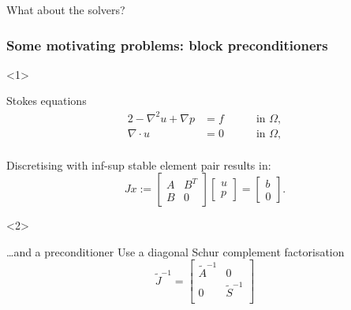 \documentclass[presentation,aspectratio=43, 10pt]{beamer}
\begin{document}
\begin{frame}[standout]
  What about the solvers?
\end{frame}

\begin{frame}[t]
  \frametitle{Some motivating problems: block preconditioners}

  \begin{onlyenv}<1>
    \begin{block}{Stokes equations}
      \begin{alignat*}{2}
        -\nabla^2 u + \nabla p &= f \quad && \text{ in } \Omega, \\
        \nabla \cdot u &= 0 \quad && \text{ in } \Omega, \\
      \end{alignat*}

      Discretising with inf-sup stable element pair results in:
      \begin{equation*}
        Jx := \begin{bmatrix}
          A & B^T \\
          B & 0
        \end{bmatrix}
        \begin{bmatrix}
          u \\ p
        \end{bmatrix}
        =
        \begin{bmatrix}
          b \\ 0
        \end{bmatrix}.
      \end{equation*}
    \end{block}
  \end{onlyenv}
  \begin{onlyenv}<2>
    \begin{block}{\dots and a preconditioner}
      Use a diagonal Schur complement factorisation
      \parencite{Silvester:1994}
      \begin{equation*}
        \tilde{J}^{-1} =
        \begin{bmatrix}
          \tilde{A}^{-1}  & 0 \\
          0 & \tilde{S}^{-1} \\
        \end{bmatrix}
      \end{equation*}


\end{block}
\end{onlyenv}
\end{frame}
\end{document}
